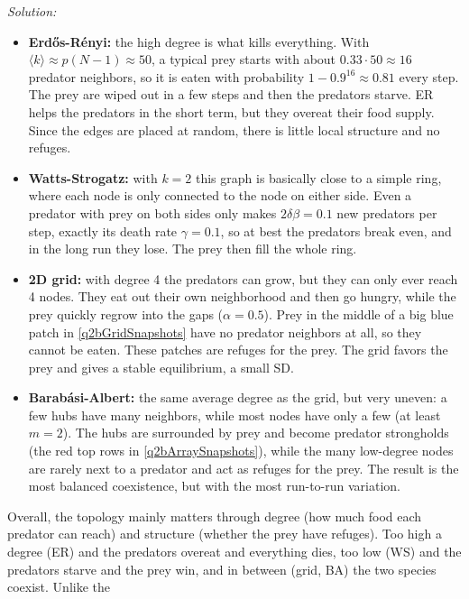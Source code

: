 \documentclass{article}
\newenvironment{solution}
    {\noindent \textit{Solution:}\vspace{1em}\\}
    {\newpage}
\newcommand{\pl}{\left(}
\newcommand{\pr}{\right)}
\begin{document}
\begin{solution}
\begin{enumerate}
\begin{enumerate}
        \begin{itemize}
            \item \textbf{Erd\H{o}s-R\'enyi:} the high degree is what kills everything. With $\langle k \rangle \approx p\pl N-1 \pr \approx 50$,
            a typical prey starts with about $0.33 \cdot 50 \approx 16$ predator neighbors, so it is eaten with
            probability $1 - 0.9^{16} \approx 0.81$ every step. The prey are wiped out in a few steps and then the
            predators starve. ER helps the predators in the short term, but they overeat their food supply. Since
            the edges are placed at random, there is little local structure and no refuges.
            \item \textbf{Watts-Strogatz:} with $k = 2$ this graph is basically close to a simple ring, where each node is only
            connected to the node on either side. Even a predator with prey on both sides only makes
            $2\delta\beta = 0.1$ new predators per step, exactly its death rate $\gamma = 0.1$, so at best the
            predators break even, and in the long run they lose. The prey then fill the whole ring.
            \item \textbf{2D grid:} with degree 4 the predators can grow, but they can only ever reach 4 nodes. They
            eat out their own neighborhood and then go hungry, while the prey quickly regrow into the gaps
            ($\alpha = 0.5$). Prey in the middle of a big blue patch in \autoref{q2bGridSnapshots} have no predator
            neighbors at all, so they cannot be eaten. These patches are refuges for the prey. The grid favors the prey and gives a stable
            equilibrium, a small SD.
            \item \textbf{Barab\'asi-Albert:} the same average degree as the grid, but very uneven: a few hubs have
            many neighbors, while most nodes have only a few (at least $m = 2$). The hubs are surrounded by prey and become predator strongholds (the
            red top rows in \autoref{q2bArraySnapshots}), while the many low-degree nodes are rarely next to a
            predator and act as refuges for the prey. The result is the most balanced coexistence, but with the most run-to-run variation.
        \end{itemize}
        Overall, the topology mainly matters through degree (how much food each predator can reach) and structure
        (whether the prey have refuges). Too high a degree (ER) and the predators overeat and everything dies, too low
        (WS) and the predators starve and the prey win, and in between (grid, BA) the two species coexist. Unlike the

\end{enumerate}
\end{enumerate}
\end{solution}
\end{document}

